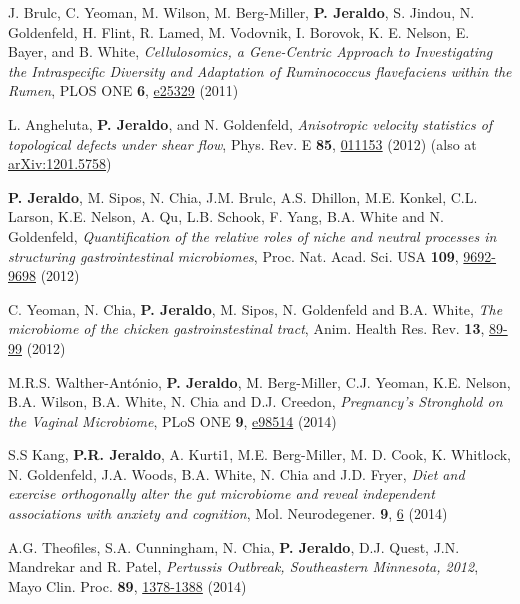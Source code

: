 \documentclass[letterpaper]{article}
\renewenvironment{itemize}{
  \begin{list}{}{
    \setlength{\leftmargin}{1.5em}
  }
}{
  \end{list}
}
\begin{document}
\begin{itemize}
\item J. Brulc, C. Yeoman, M. Wilson, M. Berg-Miller, \textbf{P. Jeraldo},
S. Jindou, N. Goldenfeld, H. Flint, R. Lamed, M. Vodovnik, I. Borovok, K. E. Nelson,
E. Bayer, and B. White, \textit{Cellulosomics, a Gene-Centric Approach to
Investigating the Intraspecific Diversity and Adaptation of Ruminococcus
flavefaciens within the Rumen}, PLOS ONE \textbf{6},
\href{http://www.plosone.org/article/info:doi/10.1371/journal.pone.0025329}{
e25329} (2011)
\item L. Angheluta, \textbf{P. Jeraldo}, and N. Goldenfeld, \textit{Anisotropic
velocity statistics of topological defects under shear flow}, Phys. Rev. E
\textbf{85}, \href{http://link.aps.org/doi/10.1103/PhysRevE.85.011153}{011153}
(2012) (also at \href{http://arxiv.org/abs/1201.5758}{arXiv:1201.5758})
\item \textbf{P. Jeraldo}, M. Sipos, N. Chia, J.M. Brulc, A.S. Dhillon, M.E. Konkel, C.L. Larson,
K.E. Nelson, A. Qu, L.B. Schook, F. Yang, B.A. White and N. Goldenfeld,
\textit{Quantification of the relative roles of niche and neutral processes in structuring gastrointestinal microbiomes},
Proc. Nat. Acad. Sci. USA \textbf{109}, \href{http://dx.doi.org/10.1073/pnas.1206721109}{9692-9698} (2012)
\item C. Yeoman, N. Chia, \textbf{P. Jeraldo}, M. Sipos, N. Goldenfeld and B.A. White,
\textit{The microbiome of the chicken gastroinstestinal tract},
Anim. Health Res. Rev. \textbf{13}, \href{http://dx.doi.org/10.1017/S1466252312000138}{89-99} (2012)
\item M.R.S. Walther-António, \textbf{P. Jeraldo}, M. Berg-Miller, C.J. Yeoman, K.E. Nelson, B.A. Wilson, B.A. White, N. Chia and D.J. Creedon, \textit{Pregnancy's Stronghold on the Vaginal Microbiome}, PLoS ONE \textbf{9}, \href{http://dx.plos.org/10.1371/journal.pone.0098514.g008}{e98514} (2014)
\item S.S Kang, \textbf{P.R. Jeraldo}, A. Kurti1, M.E. Berg-Miller, M. D. Cook, K. Whitlock, N. Goldenfeld, J.A. Woods, B.A. White, N. Chia and J.D. Fryer, \textit{Diet and exercise orthogonally alter the gut microbiome and reveal independent associations with anxiety and cognition}, Mol. Neurodegener. \textbf{9},  \href{http://dx.doi.org/10.1186/1750-1326-9-36}{6} (2014)
\item A.G. Theofiles, S.A. Cunningham, N. Chia, \textbf{P. Jeraldo}, D.J. Quest, J.N. Mandrekar and R. Patel, \textit{Pertussis Outbreak, Southeastern Minnesota, 2012}, Mayo Clin. Proc. \textbf{89}, \href{http://dx.doi.org/10.1016/j.mayocp.2014.08.004}{1378-1388} (2014)

\end{itemize}
\end{document}
